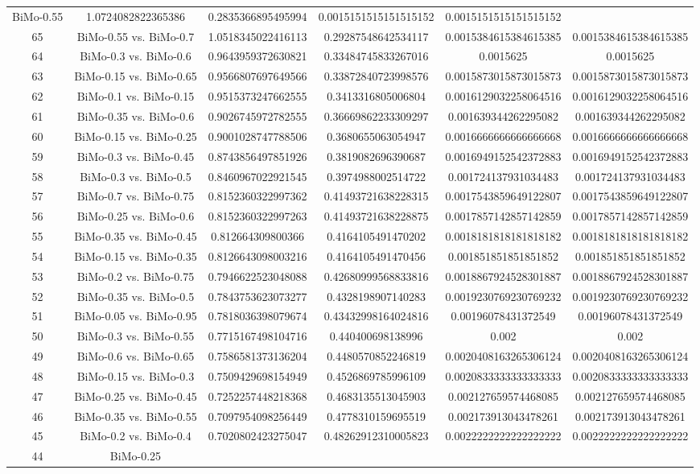 \documentclass[a4paper,10pt]{article}
\begin{document}
\begin{landscape}
\begin{table}[!htp]
\begin{tabular}{cccccc}
BiMo-0.55&1.0724082822365386&0.2835366895495994&0.0015151515151515152&0.0015151515151515152\\65&BiMo-0.55 vs. BiMo-0.7&1.0518345022416113&0.29287548642534117&0.0015384615384615385&0.0015384615384615385\\64&BiMo-0.3 vs. BiMo-0.6&0.9643959372630821&0.33484745833267016&0.0015625&0.0015625\\63&BiMo-0.15 vs. BiMo-0.65&0.9566807697649566&0.33872840723998576&0.0015873015873015873&0.0015873015873015873\\62&BiMo-0.1 vs. BiMo-0.15&0.9515373247662555&0.3413316805006804&0.0016129032258064516&0.0016129032258064516\\61&BiMo-0.35 vs. BiMo-0.6&0.9026745972782555&0.36669862233309297&0.001639344262295082&0.001639344262295082\\60&BiMo-0.15 vs. BiMo-0.25&0.9001028747788506&0.3680655063054947&0.0016666666666666668&0.0016666666666666668\\59&BiMo-0.3 vs. BiMo-0.45&0.8743856497851926&0.3819082696390687&0.0016949152542372883&0.0016949152542372883\\58&BiMo-0.3 vs. BiMo-0.5&0.8460967022921545&0.3974988002514722&0.001724137931034483&0.001724137931034483\\57&BiMo-0.7 vs. BiMo-0.75&0.8152360322997362&0.41493721638228315&0.0017543859649122807&0.0017543859649122807\\56&BiMo-0.25 vs. BiMo-0.6&0.8152360322997263&0.41493721638228875&0.0017857142857142859&0.0017857142857142859\\55&BiMo-0.35 vs. BiMo-0.45&0.812664309800366&0.4164105491470202&0.0018181818181818182&0.0018181818181818182\\54&BiMo-0.15 vs. BiMo-0.35&0.8126643098003216&0.4164105491470456&0.001851851851851852&0.001851851851851852\\53&BiMo-0.2 vs. BiMo-0.75&0.7946622523048088&0.42680999568833816&0.0018867924528301887&0.0018867924528301887\\52&BiMo-0.35 vs. BiMo-0.5&0.7843753623073277&0.4328198907140283&0.0019230769230769232&0.0019230769230769232\\51&BiMo-0.05 vs. BiMo-0.95&0.7818036398079674&0.43432998164024816&0.00196078431372549&0.00196078431372549\\50&BiMo-0.3 vs. BiMo-0.55&0.7715167498104716&0.440400698138996&0.002&0.002\\49&BiMo-0.6 vs. BiMo-0.65&0.7586581373136204&0.4480570852246819&0.0020408163265306124&0.0020408163265306124\\48&BiMo-0.15 vs. BiMo-0.3&0.7509429698154949&0.4526869785996109&0.0020833333333333333&0.0020833333333333333\\47&BiMo-0.25 vs. BiMo-0.45&0.7252257448218368&0.4683135513045903&0.002127659574468085&0.002127659574468085\\46&BiMo-0.35 vs. BiMo-0.55&0.7097954098256449&0.4778310159695519&0.002173913043478261&0.002173913043478261\\45&BiMo-0.2 vs. BiMo-0.4&0.7020802423275047&0.48262912310005823&0.0022222222222222222&0.0022222222222222222\\44&BiMo-0.25 
\end{tabular}
\end{table}
\end{landscape}
\end{document}
